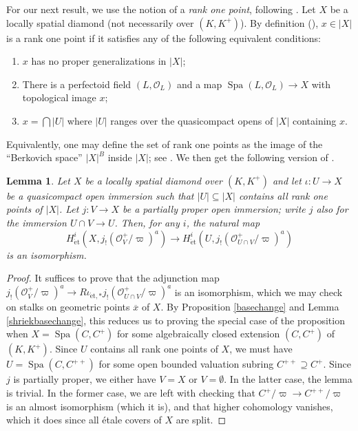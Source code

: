 \documentclass{amsart}
\newtheorem{lemma}[subsubsection]{Lemma}
\theoremstyle{remark}
\numberwithin{equation}{subsection}
\newcommand{\cO}{{\mathcal O}}
\DeclareMathOperator{\Spa}{Spa}
\newcommand{\et}{\mathrm{\acute{e}t}}
\newcommand{\ol}{\overline}
\renewcommand{\(}{\left(}
\renewcommand{\)}{\right)}
\begin{document}
\medskip

For our next result, we use the notion of a \emph{rank one point}, following \cite{extensions}. Let $X$ be a locally spatial diamond (not necessarily over $(K,K^{+})$). By definition (\cite[Definition 3.2.1]{extensions}), $x\in |X|$ is a rank one point if it satisfies any of the following equivalent conditions:
\begin{enumerate}
\item $x$ has no proper generalizations in $|X|$;

\item There is a perfectoid field $(L,\cO_{L})$ and a map $\Spa(L,\cO_{L}) \to X$ with topological image $x$;

\item $x= \bigcap |U|$ where $|U|$ ranges over the quasicompact opens of $|X|$ containing $x$.
\end{enumerate}
Equivalently, one may define the set of rank one points as the image of the ``Berkovich space'' $|X|^{B}$ inside $|X|$; see \cite[Definition 13.7]{diamonds}. We then get the following version of \cite[Lemma 4.4.2]{caraiani-scholze}.

\begin{lemma}\label{rankonepointsisom}
Let $X$ be a locally spatial diamond over $(K,K^{+})$ and let $\iota \colon U \to X$ be a quasicompact open immersion such that $|U|\subseteq |X|$ contains all rank one points of $|X|$. Let $j \colon V \to X$ be a partially proper open immersion; write $j$ also for the immersion $U \cap V \to U$. Then, for any $i$, the natural map
$$ H^{i}_{\et}(X,j_{!}(\cO^{+}_{V}/\varpi)^{a} ) \to H^{i}_{\et}(U,j_{!}(\cO^{+}_{U\cap V}/\varpi)^{a}) $$
is an isomorphism.
\end{lemma} 

\begin{proof}
It suffices to prove that the adjunction map $j_{!}(\cO_{V}^{+}/\varpi)^{a} \to R\iota_{\et,\ast}j_{!}(\cO_{U\cap V}^{+}/\varpi)^{a}$ is an isomorphism, which we may check on stalks on geometric points $\ol{x}$ of $X$. By Proposition \ref{basechange} and Lemma \ref{shriekbasechange}, this reduces us to proving the special case of the proposition when $X=\Spa(C,C^{+})$ for some algebraically closed extension $(C,C^{+})$ of $(K,K^{+})$. Since $U$ contains all rank one points of $X$, we must have $U=\Spa(C,C^{++})$ for some open bounded valuation subring $C^{++} \supseteq C^{+}$. Since $j$ is partially proper, we either have $V=X$ or $V=\emptyset$. In the latter case, the lemma is trivial. In the former case, we are left with checking that $C^{+}/\varpi \to C^{++}/\varpi $ is an almost isomorphism (which it is), and that higher cohomology vanishes, which it does since all \'etale covers of $X$ are split.
\end{proof}
\end{document}

